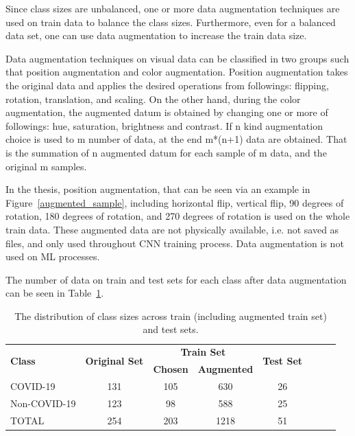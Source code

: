 Since class sizes are unbalanced, one or more data augmentation techniques are used on train data to balance the class sizes. Furthermore, even for a balanced data set, one can use data augmentation to increase the train data size.

Data augmentation techniques on visual data can be classified in two groups such that position augmentation and color augmentation. Position augmentation takes the original data and applies the desired operations from followings: flipping, rotation, translation, and scaling. On the other hand, during the color augmentation, the augmented datum is obtained by changing one or more of followings: hue, saturation, brightness and contrast. If n kind augmentation choice is used to m number of data, at the end m*(n+1) data are obtained. That is the summation of n augmented datum for each sample of m data, and the original m samples.

In the thesis,  position augmentation, that can be seen via an example in Figure~\ref{augmented_sample}, including horizontal flip,  vertical flip,  90 degrees of rotation, 180 degrees of rotation, and 270 degrees of rotation is used on the whole train data. These augmented data are not physically available, i.e. not saved as files, and only used throughout CNN training process. Data augmentation is not used on ML processes.

The number of data on train and test sets for each class after data augmentation can be seen in Table~\ref{tab:final_dataset_size}.

\begin{table}[h]
{
    \setlength{\tabcolsep}{14pt}
    \caption{The distribution of class sizes across train (including augmented train set) and test sets.}
    \begin{center}
    \begin{tabular}{lccrrrrr}
    \hline
    \multirow{2}{*}{\textbf{Class}} & \multirow{2}{*}{\textbf{Original Set}} & \multicolumn{2}{c}{\textbf{Train Set}} & \multirow{2}{*}{\textbf{Test Set}} \\ \cline{3-4}
                           &                               & \textbf{Chosen}  & \textbf{Augmented}  &    \\
    \hline \hline
    COVID-19           & 131                           & 105     & \multicolumn{1}{c}{630} & \multicolumn{1}{c}{26} \\
    Non-COVID-19               & 123                           & 98      & \multicolumn{1}{c}{588} & \multicolumn{1}{c}{25} \\
    TOTAL                  & 254                           & 203     & \multicolumn{1}{c}{1218} & \multicolumn{1}{c}{51} \\   
    \hline
    \end{tabular}
    \end{center}
    \label{tab:final_dataset_size}
}
\end{table}

